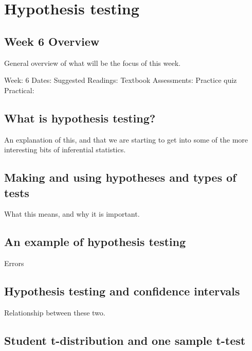 \documentclass[
]{scrbook}
\begin{document}
\hypertarget{part-hypothesis-testing}{%
\part{Hypothesis testing}\label{part-hypothesis-testing}}

\hypertarget{Week6}{%
\chapter*{Week 6 Overview}\label{Week6}}

General overview of what will be the focus of this week.

Week: 6
Dates:
Suggested Readings: Textbook
Assessments: Practice quiz
Practical:

\hypertarget{what-is-hypothesis-testing}{%
\chapter{What is hypothesis testing?}\label{what-is-hypothesis-testing}}

An explanation of this, and that we are starting to get into some of the more interesting bits of inferential statistics.

\hypertarget{making-and-using-hypotheses-and-types-of-tests}{%
\chapter{Making and using hypotheses and types of tests}\label{making-and-using-hypotheses-and-types-of-tests}}

What this means, and why it is important.

\hypertarget{an-example-of-hypothesis-testing}{%
\chapter{An example of hypothesis testing}\label{an-example-of-hypothesis-testing}}

Errors

\hypertarget{hypothesis-testing-and-confidence-intervals}{%
\chapter{Hypothesis testing and confidence intervals}\label{hypothesis-testing-and-confidence-intervals}}

Relationship between these two.

\hypertarget{student-t-distribution-and-one-sample-t-test}{%
\chapter{Student t-distribution and one sample t-test}\label{student-t-distribution-and-one-sample-t-test}}
\end{document}
